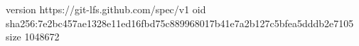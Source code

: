 version https://git-lfs.github.com/spec/v1
oid sha256:7e2bc457ae1328e11ed16fbd75c889968017b41e7a2b127c5bfea5dddb2e7105
size 1048672
